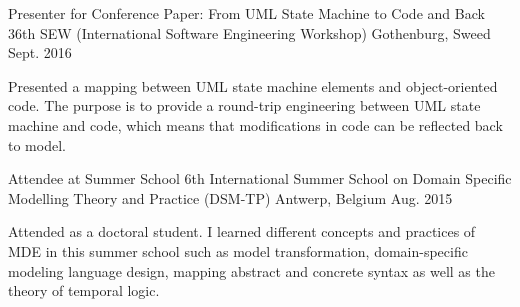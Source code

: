 \begin{cventries}

\cventry
{Presenter for Conference Paper: From UML State Machine to Code and Back} %
{36th SEW (International Software Engineering Workshop)} %
{Gothenburg, Sweed} %
{Sept. 2016} %
{ %
	\begin{cvitems}
		\item {Presented a mapping between UML state machine elements and object-oriented code. The purpose is to provide a round-trip engineering between UML state machine and code, which means that modifications in code can be reflected back to model.}
	\end{cvitems}
}

\cventry
{Attendee at Summer School} %
{6th International Summer School on Domain Specific Modelling Theory and Practice (DSM-TP)} %
{Antwerp, Belgium} %
{Aug. 2015} %
{ %
	\begin{cvitems}
		\item {Attended as a doctoral student. I learned different concepts and practices of MDE in this summer school such as model transformation, domain-specific modeling language design, mapping abstract and concrete syntax as well as the theory of temporal logic.}
	\end{cvitems}
}

\end{cventries}